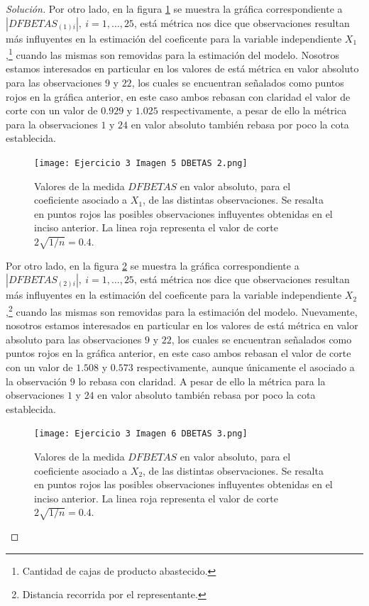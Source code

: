 \documentclass[10.5pt,notitlepage]{article}
\newenvironment{solucion}
  {\begin{proof}[Solución]}
  {\end{proof}}
\newcommand{\abs}[1]{\left\lvert #1 \right\rvert}
\theoremstyle{plain}
\begin{document}
\begin{solucion}
Por otro lado, en la figura \ref{fig:13} se muestra la gráfica correspondiente a \(\abs{DFBETAS_{(1)i}} , \ i = 1,\hdots,25 \), está métrica nos dice que observaciones resultan más influyentes en la estimación del coeficente para la variable independiente \(X_1\),\footnote{Cantidad de cajas de producto abastecido.} cuando las mismas son removidas para la estimación del modelo. Nosotros estamos interesados en particular en los valores de está métrica en valor absoluto para las observaciones \(9\) y \(22\), los cuales se encuentran señalados como puntos rojos en la gráfica anterior, en este caso ambos rebasan con claridad el valor de corte con un valor de \(0.929\) y \(1.025\) respectivamente, a pesar de ello la métrica para la observaciones \(1\) y \(24\) en valor absoluto también rebasa por poco la cota establecida.\\ 
\begin{figure}[htb]
 \centering
 \texttt{[image: Ejercicio 3 Imagen 5 DBETAS 2.png]}
 \caption{Valores de la medida \(DFBETAS\) en valor absoluto, para el coeficiente asociado a \(X_1\), de las distintas observaciones. Se resalta en puntos rojos las posibles observaciones influyentes obtenidas en el inciso anterior. La linea roja representa el valor de corte \(2\sqrt{1/n} = 0.4\).}
\label{fig:13}
\end{figure}

Por otro lado, en la figura \ref{fig:14} se muestra la gráfica correspondiente a \(\abs{DFBETAS_{(2)i}} , \ i = 1,\hdots,25 \), está métrica nos dice que observaciones resultan más influyentes en la estimación del coeficente para la variable independiente \(X_2\),\footnote{Distancia recorrida por el representante.} cuando las mismas son removidas para la estimación del modelo. Nuevamente, nosotros estamos interesados en particular en los valores de está métrica en valor absoluto para las observaciones \(9\) y \(22\), los cuales se encuentran señalados como puntos rojos en la gráfica anterior, en este caso ambos rebasan el valor de corte con un valor de \(1.508\) y \(0.573\) respectivamente, aunque únicamente el asociado a la observación \(9\) lo rebasa con claridad. A pesar de ello la métrica para la observaciones \(1\) y \(24\) en valor absoluto también rebasa por poco la cota establecida. \\ 
\begin{figure}[htb]
 \centering
 \texttt{[image: Ejercicio 3 Imagen 6 DBETAS 3.png]}
 \caption{Valores de la medida \(DFBETAS\) en valor absoluto, para el coeficiente asociado a \(X_2\), de las distintas observaciones. Se resalta en puntos rojos las posibles observaciones influyentes obtenidas en el inciso anterior. La linea roja representa el valor de corte \(2\sqrt{1/n} = 0.4\).}
\label{fig:14}
\end{figure}


\end{solucion}
\end{document}
